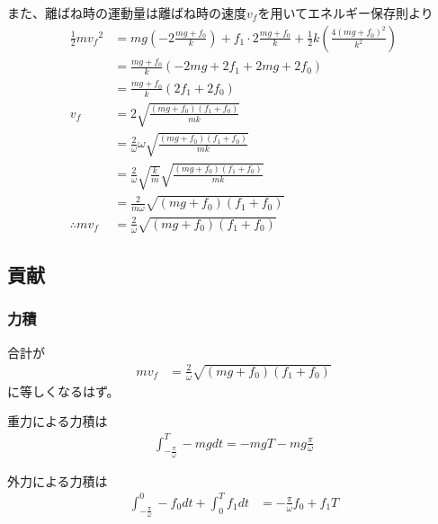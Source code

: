 \documentclass[a4paper,11pt]{jsarticle}
\begin{document}
また、離ばね時の運動量は離ばね時の速度$v_f$を用いてエネルギー保存則より
\begin{align}
  \frac{1}{2}m{v_f}^2
   & = mg\left(-2\frac{mg+f_0}{k}\right)
  + f_1\cdot 2\frac{mg+f_0}{k} + \frac{1}{2}k\left( \frac{4(mg+f_0)^2}{k^2} \right)
  \\
   & = \frac{mg+f_0}{k}\left( -2mg + 2f_1 + 2mg + 2f_0 \right)
  \\
   & = \frac{mg+f_0}{k}\left( 2f_1 + 2f_0 \right)
  \\
  v_f
   & = 2\sqrt{\frac{(mg + f_0) (f_1 + f_0)}{mk}}
  \\
   & = \frac{2}{\omega}\omega \sqrt{\frac{(mg + f_0) (f_1 + f_0)}{mk}}
  \\
   & = \frac{2}{\omega} \sqrt{\frac{k}{m}} \sqrt{\frac{(mg + f_0) (f_1 + f_0)}{mk}}
  \\
   & = \frac{2}{m\omega}\sqrt{(mg + f_0)(f_1 + f_0)}
  \\ \therefore
  mv_f
   & = \frac{2}{\omega} \sqrt{(mg + f_0)(f_1 + f_0)}
\end{align}

\subsection{貢献}

\subsubsection{力積}
合計が
\begin{align}
  mv_f
   & = \frac{2}{\omega} \sqrt{(mg + f_0)(f_1 + f_0)}
\end{align}
に等しくなるはず。

重力による力積は
\begin{align}
  \int_{-\frac{\pi}{\omega}}^{T} -mgdt = -mgT - mg\frac{\pi}{\omega}
\end{align}

外力による力積は
\begin{align}
  \int_{-\frac{\pi}{\omega}}^{0} -f_0 dt
  + \int_0^T f_1 dt
  &= -\frac{\pi}{\omega}f_0 + f_1 T
\end{align}
\end{document}
